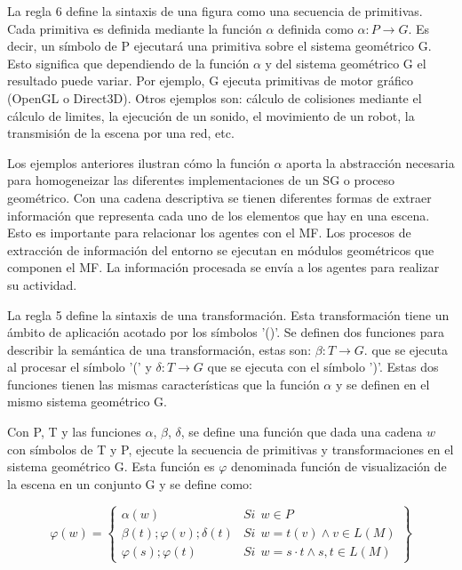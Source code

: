 \documentclass[runningheads]{llncs}
\begin{document}
	La regla 6 define la sintaxis de una figura como una secuencia de primitivas. Cada primitiva es definida mediante la funci\'on $\alpha$ definida como $\alpha:P\rightarrow G$. Es decir, un s\'imbolo de P ejecutar\'a una primitiva sobre el sistema geom\'etrico G. Esto significa que dependiendo de la funci\'on $\alpha$ y del sistema geom\'etrico G el resultado puede variar. Por ejemplo, G ejecuta primitivas de motor gr\'afico (OpenGL o Direct3D). Otros ejemplos son: c\'alculo de colisiones mediante el c\'alculo de limites, la ejecuci\'on de un sonido, el movimiento de un robot, la transmisi\'on de la escena por una red, etc.	
	
	Los ejemplos anteriores ilustran c\'omo la funci\'on $\alpha$ aporta la abstracci\'on necesaria para homogeneizar las diferentes implementaciones de un SG o proceso geom\'etrico. Con una cadena descriptiva se tienen diferentes formas de extraer informaci\'on que representa cada uno de los elementos que hay en una escena. Esto es importante para relacionar los agentes con el MF. Los procesos de extracci\'on de informaci\'on del entorno se ejecutan en m\'odulos geom\'etricos que componen el MF. La informaci\'on procesada se env\'ia a los agentes para realizar su actividad.
	
	La regla 5 define la sintaxis de una transformaci\'on. Esta transformaci\'on tiene un \'ambito de aplicaci\'on acotado por los s\'imbolos '()'. Se definen dos funciones para describir la sem\'antica de una transformaci\'on, estas son: $\beta:T\rightarrow G$. que se ejecuta al procesar el s\'imbolo '(' y $\delta:T\rightarrow G$ que se ejecuta con el s\'imbolo ')'. Estas dos funciones tienen las mismas caracter\'isticas que la funci\'on $\alpha$ y se definen en el mismo sistema geom\'etrico G.

Con P, T y las funciones $\alpha$, $\beta$, $\delta$, se define una funci\'on que dada una cadena $w$ con s\'imbolos de T y P, ejecute la secuencia de primitivas y transformaciones en el sistema geom\'etrico G. Esta funci\'on es $\varphi$ denominada funci\'on de visualizaci\'on de la escena en un conjunto G y se define como:

\begin{equation}
    \varphi (w) = \left\{
    \begin{array}{ll}
        \alpha(w) & \mathit{Si} \ \ w \in P  \\
        \beta(t); \varphi(v); \delta(t) & \mathit{Si} \ \ w = t(v) \wedge v \in L(M) \\
        \varphi(s); \varphi(t)  & \mathit{Si} \ \ w = s \cdotp t \wedge s, t \in L(M)
    \end{array}\right\}
\end{equation}
\end{document}
